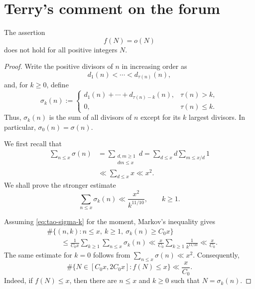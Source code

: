 \section{Terry's comment on the forum}


\begin{proposition}
The assertion
\[
    f(N)=o(N)
\]
does not hold for all positive integers $N$.
\end{proposition}

\begin{proof}
Write the positive divisors of $n$ in increasing order as
\[
    d_1(n)<\cdots<d_{\tau(n)}(n),
\]
and, for $k\geq 0$, define
\[
    \sigma_k(n)
    :=
    \begin{cases}
    d_1(n)+\cdots+d_{\tau(n)-k}(n),
        & \tau(n)>k,\\
    0,  & \tau(n)\leq k.
    \end{cases}
\]
Thus, $\sigma_k(n)$ is the sum of all divisors of $n$ except
for its $k$ largest divisors. In particular,
$\sigma_0(n)=\sigma(n)$.

We first recall that
\[
\begin{aligned}
    \sum_{n\leq x}\sigma(n)
    &=\sum_{\substack{d,m\geq1\\dm\leq x}}d
      =\sum_{d\leq x}d
        \sum_{m\leq x/d}1  \\
    &\ll \sum_{d\leq x}x
     \ll x^2.
\end{aligned}
\]
We shall prove the stronger estimate
\begin{equation}\label{eq:tao-sigma-k}
    \sum_{n\leq x}\sigma_k(n)
    \ll \frac{x^2}{k^{11/10}},
    \qquad k\geq1.
\end{equation}

Assuming \eqref{eq:tao-sigma-k} for the moment, Markov's
inequality gives
\[
\begin{aligned}
&\#\bigl\{(n,k):n\leq x,\ k\geq1,\
                 \sigma_k(n)\geq C_0x\bigr\}  \\
&\qquad\leq
 \frac{1}{C_0x}
 \sum_{k\geq1}\sum_{n\leq x}\sigma_k(n)
 \ll
 \frac{x}{C_0}\sum_{k\geq1}\frac{1}{k^{11/10}}
 \ll \frac{x}{C_0}.
\end{aligned}
\]
The same estimate for $k=0$ follows from
$\sum_{n\leq x}\sigma(n)\ll x^2$. Consequently,
\begin{equation}\label{eq:tao-count}
    \#\bigl\{N\in[C_0x,2C_0x]:f(N)\leq x\bigr\}
    \ll \frac{x}{C_0}.
\end{equation}
Indeed, if $f(N)\leq x$, then there are $n\leq x$ and
$k\geq0$ such that $N=\sigma_k(n)$.


\end{proof}
